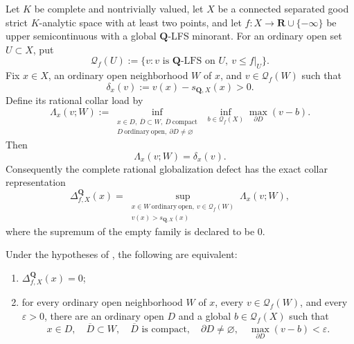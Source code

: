 \begin{theorem}
\label{thm:p031-rational-collar-minimax}
Let $K$ be complete and nontrivially valued, let $X$ be a connected
separated good strict $K$-analytic space with at least two points, and let
$f:X\to\mathbf R\cup\{-\infty\}$ be upper semicontinuous with a global
$\mathbf Q$-LFS minorant.  For an ordinary open set $U\subset X$, put
\begin{equation}
\label{eq:p031-rational-minorant-family}
 \mathcal Q_f(U):=
 \{v:v\text{ is $\mathbf Q$-LFS on }U,\ v\leq f|_U\}.
\end{equation}
Fix $x\in X$, an ordinary open neighborhood $W$ of $x$, and
$v\in\mathcal Q_f(W)$ such that
\begin{equation}
\label{eq:p031-positive-rational-globalization-gap}
             \delta_x(v):=v(x)-s_{\mathbf Q,X}(x)>0.
\end{equation}
Define its rational collar load by
\begin{equation}
\label{eq:p031-rational-local-collar-load}
 \Lambda_x(v;W):=
 \inf_{\substack{x\in D,\ \overline D\subset W,\ \overline D\ \mathrm{compact}\\
                  D\ \mathrm{ordinary\ open},\ \partial D\ne\varnothing}}
 \ \inf_{b\in\mathcal Q_f(X)}
                  \max_{\partial D}(v-b).
\end{equation}
Then
\begin{equation}
\label{eq:p031-rational-collar-minimax}
                  \Lambda_x(v;W)=\delta_x(v).
\end{equation}
Consequently the complete rational globalization defect has the exact
collar representation
\begin{equation}
\label{eq:p031-rational-defect-collar-formula}
 \Delta^{\mathbf Q}_{f,X}(x)
  =\sup_{\substack{x\in W\ \mathrm{ordinary\ open},\ v\in\mathcal Q_f(W)\\
                    v(x)>s_{\mathbf Q,X}(x)}}
                         \Lambda_x(v;W),
\end{equation}
where the supremum of the empty family is declared to be $0$.
\end{theorem}

\begin{corollary}
\label{cor:p031-rational-collar-absorption}
Under the hypotheses of , the
following are equivalent:
\begin{enumerate}[label=\textup{(\roman*)}]
\item
$\Delta^{\mathbf Q}_{f,X}(x)=0$;
\item
for every ordinary open neighborhood $W$ of $x$, every
$v\in\mathcal Q_f(W)$, and every $\varepsilon>0$, there are an ordinary
open $D$ and a global $b\in\mathcal Q_f(X)$ such that
\begin{equation}
\label{eq:p031-rational-collar-absorption}
 x\in D,\quad \overline D\subset W,\quad \overline D\text{ is compact},
 \quad\partial D\ne\varnothing,
 \quad\max_{\partial D}(v-b)<\varepsilon.
\end{equation}
\end{enumerate}
\end{corollary}

